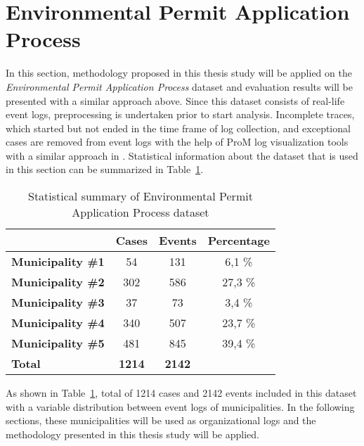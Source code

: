 \section{Environmental Permit Application Process}
\label{sec:environmental-permit-application-process}
In this section, methodology proposed in this thesis study will be applied on the \textit{Environmental Permit Application Process} dataset \cite{coselog-data} and evaluation results will be presented with a similar approach above. Since this dataset consists of real-life event logs, preprocessing is undertaken prior to start analysis. Incomplete traces, which started but not ended in the time frame of log collection, and exceptional cases are removed from event logs with the help of ProM log visualization tools with a similar approach in \cite{buijs2014flexible}. Statistical information about the dataset that is used in this section can be summarized in Table~\ref{table:coselog-process-summary}.

 \begin{table}[]
\centering
\caption{Statistical summary of Environmental Permit Application Process dataset}
\label{table:coselog-process-summary}
\begin{tabular}{lccc}
\hline
                       & {\bf Cases} & {\bf Events} & {\bf Percentage} \\ \hline
{\bf Municipality \#1} & 54          & 131          & 6,1 \%           \\ \hline
{\bf Municipality \#2} & 302         & 586          & 27,3 \%          \\ \hline
{\bf Municipality \#3} & 37          & 73           & 3,4 \%           \\ \hline
{\bf Municipality \#4} & 340         & 507          & 23,7 \%          \\ \hline
{\bf Municipality \#5} & 481         & 845          & 39,4 \%          \\
{\bf Total}            & {\bf 1214}  & {\bf 2142}   & {\bf }           \\ \hline
\end{tabular}
\end{table}

As shown in Table~\ref{table:coselog-process-summary}, total of 1214 cases and 2142 events included in this dataset with a variable distribution between event logs of municipalities. In the following sections, these municipalities will be used as organizational logs and the methodology presented in this thesis study will be applied.

